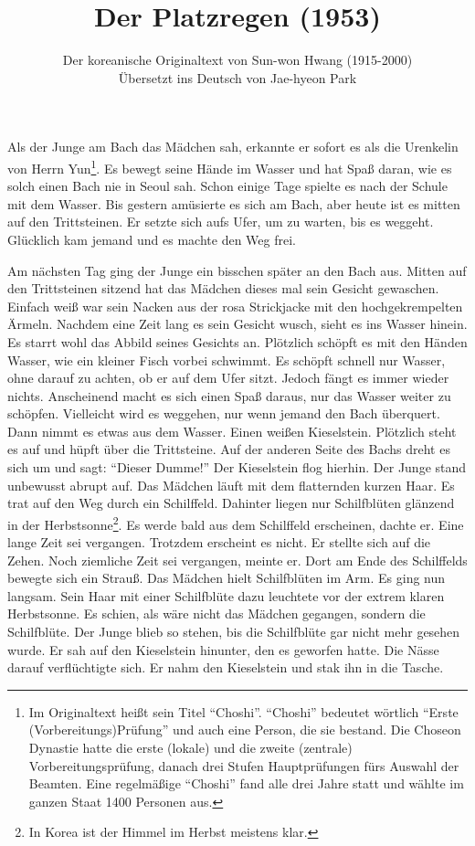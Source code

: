 \documentclass[prd,12pt,tightenlines,notitlepage,nofootinbib]{revtex4-1}
\begin{document}
\title{Der Platzregen (1953)}
\author{Der koreanische Originaltext von Sun-won Hwang (1915-2000)
\\ Übersetzt ins Deutsch von Jae-hyeon Park}
\maketitle

\noindent
Als der Junge am Bach das Mädchen sah, erkannte er sofort es als die
Urenkelin von Herrn Yun\footnote{Im Originaltext heißt sein Titel "`Choshi"'.
"`Choshi"' bedeutet wörtlich "`Erste (Vorbereitungs)Prüfung"' und
auch eine Person, die sie bestand.
Die Choseon Dynastie hatte
die erste (lokale) und die zweite (zentrale) Vorbereitungsprüfung,
danach drei Stufen Hauptprüfungen fürs Auswahl der Beamten.
Eine regelmäßige "`Choshi"' fand alle drei Jahre statt und
wählte im ganzen Staat 1400 Personen aus.}.
Es bewegt seine Hände im Wasser und hat
Spaß daran, wie es solch einen Bach nie in Seoul sah.  Schon einige
Tage spielte es nach der Schule mit dem Wasser.  Bis gestern amüsierte
es sich am Bach, aber heute ist es mitten auf den Trittsteinen.  Er
setzte sich aufs Ufer, um zu warten, bis es weggeht.  Glücklich kam
jemand und es machte den Weg frei.

Am nächsten Tag ging der Junge ein bisschen später an den Bach aus.
Mitten auf den Trittsteinen sitzend hat das Mädchen dieses mal sein
Gesicht gewaschen.  Einfach weiß war sein Nacken aus der rosa
Strickjacke mit den hochgekrempelten Ärmeln.  Nachdem eine Zeit lang
es sein Gesicht wusch, sieht es ins Wasser hinein.  Es starrt wohl das
Abbild seines Gesichts an.  Plötzlich schöpft es mit den Händen
Wasser, wie ein kleiner Fisch vorbei schwimmt.  Es schöpft schnell nur
Wasser, ohne darauf zu achten, ob er auf dem Ufer sitzt.  Jedoch fängt
es immer wieder nichts.  Anscheinend macht es sich einen Spaß daraus,
nur das Wasser weiter zu schöpfen.  Vielleicht wird es weggehen, nur
wenn jemand den Bach überquert.  Dann nimmt es etwas aus dem Wasser.
Einen weißen Kieselstein.  Plötzlich steht es auf und hüpft über die
Trittsteine.  Auf der anderen Seite des Bachs dreht es sich um und
sagt: "`Dieser Dumme!"'  Der Kieselstein flog hierhin.  Der Junge stand
unbewusst abrupt auf.  Das Mädchen läuft mit dem flatternden kurzen
Haar.  Es trat auf den Weg durch ein Schilffeld.  Dahinter liegen nur
Schilfblüten glänzend in der Herbstsonne\footnote{In Korea ist
der Himmel im Herbst meistens klar.}.
Es werde bald aus dem
Schilffeld erscheinen, dachte er.  Eine lange Zeit sei vergangen.
Trotzdem erscheint es nicht.  Er stellte sich auf die Zehen.  Noch
ziemliche Zeit sei vergangen, meinte er.  Dort am Ende des
Schilffelds bewegte sich ein Strauß.  Das Mädchen hielt Schilfblüten
im Arm.  Es ging nun langsam.  Sein Haar mit einer Schilfblüte dazu
leuchtete vor der extrem klaren Herbstsonne.  Es schien, als wäre
nicht das Mädchen gegangen, sondern die Schilfblüte.  Der Junge blieb
so stehen, bis die Schilfblüte gar nicht mehr gesehen wurde.  Er sah
auf den Kieselstein hinunter, den es geworfen hatte.  Die Nässe darauf
verflüchtigte sich.  Er nahm den Kieselstein und stak ihn in die
Tasche.
\end{document}
